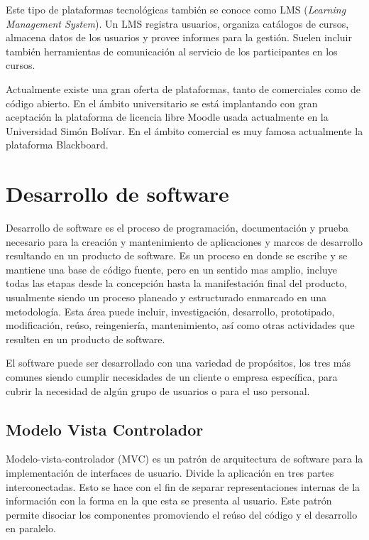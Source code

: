 Este tipo de plataformas tecnológicas también se conoce como LMS (\emph{Learning Management System}). Un LMS registra usuarios, organiza catálogos de cursos, almacena datos de los usuarios y provee informes para la gestión. Suelen incluir también herramientas de comunicación al servicio de los participantes en los cursos. 

Actualmente existe una gran oferta de plataformas, tanto de comerciales como de código abierto. En el ámbito universitario se está implantando con gran aceptación la plataforma de licencia libre Moodle usada actualmente en la Universidad Simón Bolívar. En el ámbito comercial es muy famosa actualmente la plataforma Blackboard.

\section{Desarrollo de software}

Desarrollo de software es el proceso de programación, documentación y prueba necesario para la creación y mantenimiento de aplicaciones y marcos de desarrollo resultando en un producto de software. Es un proceso en donde se escribe y se mantiene una base de código fuente, pero en un sentido mas amplio, incluye todas las etapas desde la concepción hasta la manifestación final del producto, usualmente siendo un proceso planeado y estructurado enmarcado en una metodología. Esta área puede incluir, investigación, desarrollo, prototipado, modificación, reúso, reingeniería, mantenimiento, así como otras actividades que resulten en un producto de software.

El software puede ser desarrollado con una variedad de propósitos, los tres más comunes siendo cumplir necesidades de un cliente o empresa específica, para cubrir la necesidad de algún grupo de usuarios o para el uso personal.

\subsection{Modelo Vista Controlador}

Modelo-vista-controlador (MVC) es un patrón de arquitectura de software para la implementación de interfaces de usuario. Divide la aplicación en tres partes interconectadas. Esto se hace con el fin de separar representaciones internas de la información con la forma en la que esta se presenta al usuario. Este patrón permite disociar los componentes promoviendo el reúso del código y el desarrollo en paralelo.

